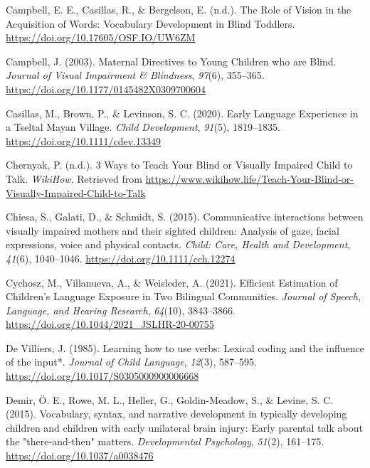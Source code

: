 \documentclass[
  man]{apa6}
\newlength{\cslhangindent}
\newlength{\cslentryspacingunit} %
\newenvironment{CSLReferences}[2] %
 {%
  \setlength{\parindent}{0pt}
  \ifodd #1
  \let\oldpar\par
  \def\par{\hangindent=\cslhangindent\oldpar}
  \fi
  \setlength{\parskip}{#2\cslentryspacingunit}
 }%
 {}
\begin{document}
\begin{CSLReferences}{1}{0}
\leavevmode{}%
Campbell, E. E., Casillas, R., \& Bergelson, E. (n.d.). The {Role} of {Vision} in the {Acquisition} of {Words}: {Vocabulary} {Development} in {Blind} {Toddlers}. \url{https://doi.org/10.17605/OSF.IO/UW6ZM}

\leavevmode{}%
Campbell, J. (2003). Maternal {Directives} to {Young} {Children} who are {Blind}. \emph{Journal of Visual Impairment \& Blindness}, \emph{97}(6), 355--365. \url{https://doi.org/10.1177/0145482X0309700604}

\leavevmode{}%
Casillas, M., Brown, P., \& Levinson, S. C. (2020). Early {Language} {Experience} in a {Tseltal} {Mayan} {Village}. \emph{Child Development}, \emph{91}(5), 1819--1835. \url{https://doi.org/10.1111/cdev.13349}

\leavevmode{}%
Chernyak, P. (n.d.). 3 {Ways} to {Teach} {Your} {Blind} or {Visually} {Impaired} {Child} to {Talk}. \emph{WikiHow}. Retrieved from \url{https://www.wikihow.life/Teach-Your-Blind-or-Visually-Impaired-Child-to-Talk}

\leavevmode{}%
Chiesa, S., Galati, D., \& Schmidt, S. (2015). Communicative interactions between visually impaired mothers and their sighted children: Analysis of gaze, facial expressions, voice and physical contacts. \emph{Child: Care, Health and Development}, \emph{41}(6), 1040--1046. \url{https://doi.org/10.1111/cch.12274}

\leavevmode{}%
Cychosz, M., Villanueva, A., \& Weisleder, A. (2021). Efficient {Estimation} of {Children}'s {Language} {Exposure} in {Two} {Bilingual} {Communities}. \emph{Journal of Speech, Language, and Hearing Research}, \emph{64}(10), 3843--3866. \url{https://doi.org/10.1044/2021_JSLHR-20-00755}

\leavevmode{}%
De Villiers, J. (1985). Learning how to use verbs: Lexical coding and the influence of the input*. \emph{Journal of Child Language}, \emph{12}(3), 587--595. \url{https://doi.org/10.1017/S0305000900006668}

\leavevmode{}%
Demir, Ö. E., Rowe, M. L., Heller, G., Goldin-Meadow, S., \& Levine, S. C. (2015). Vocabulary, syntax, and narrative development in typically developing children and children with early unilateral brain injury: Early parental talk about the "there-and-then" matters. \emph{Developmental Psychology}, \emph{51}(2), 161--175. \url{https://doi.org/10.1037/a0038476}


\end{CSLReferences}
\end{document}
